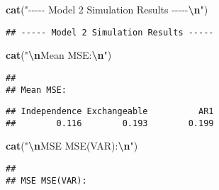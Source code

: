 \documentclass[
]{article}
\newenvironment{Shaded}{\begin{snugshade}}{\end{snugshade}}
\newcommand{\FunctionTok}[1]{\textcolor[rgb]{0.13,0.29,0.53}{\textbf{#1}}}
\newcommand{\NormalTok}[1]{#1}
\newcommand{\SpecialCharTok}[1]{\textcolor[rgb]{0.81,0.36,0.00}{\textbf{#1}}}
\newcommand{\StringTok}[1]{\textcolor[rgb]{0.31,0.60,0.02}{#1}}
\begin{document}
\begin{Shaded}
\begin{Highlighting}[]
\FunctionTok{cat}\NormalTok{(}\StringTok{"{-}{-}{-}{-}{-} Model 2 Simulation Results {-}{-}{-}{-}{-}}\SpecialCharTok{\textbackslash{}n}\StringTok{"}\NormalTok{)}
\end{Highlighting}
\end{Shaded}

\begin{verbatim}
## ----- Model 2 Simulation Results -----
\end{verbatim}

\begin{Shaded}
\begin{Highlighting}[]
\FunctionTok{cat}\NormalTok{(}\StringTok{"}\SpecialCharTok{\textbackslash{}n}\StringTok{Mean MSE:}\SpecialCharTok{\textbackslash{}n}\StringTok{"}\NormalTok{)}
\end{Highlighting}
\end{Shaded}

\begin{verbatim}
## 
## Mean MSE:
\end{verbatim}

\begin{Shaded}
\end{Shaded}

\begin{verbatim}
## Independence Exchangeable          AR1 
##        0.116        0.193        0.199
\end{verbatim}

\begin{Shaded}
\begin{Highlighting}[]
\FunctionTok{cat}\NormalTok{(}\StringTok{"}\SpecialCharTok{\textbackslash{}n}\StringTok{MSE MSE(VAR):}\SpecialCharTok{\textbackslash{}n}\StringTok{"}\NormalTok{)}
\end{Highlighting}
\end{Shaded}

\begin{verbatim}
## 
## MSE MSE(VAR):
\end{verbatim}

\begin{Shaded}
\end{Shaded}
\end{document}
